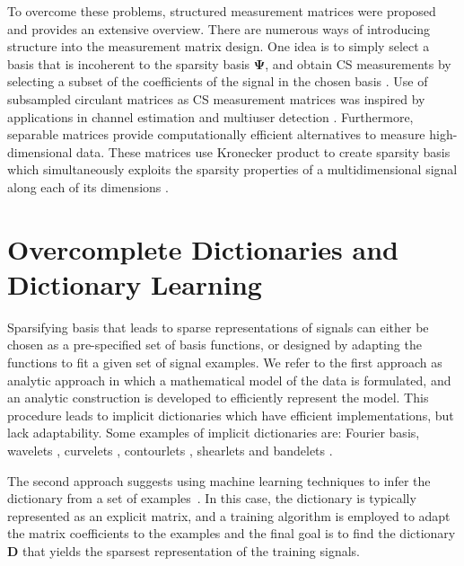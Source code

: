 \documentclass[journal]{IEEEtran}
\begin{document}
To overcome these problems, structured measurement matrices were proposed and \cite{Li2015} provides an extensive overview. There are numerous ways of introducing structure into the measurement matrix design. One idea is to simply select a basis that is incoherent to the sparsity basis $\boldsymbol{\Psi}$, and obtain CS measurements by selecting a subset of the coefficients of the signal in the chosen basis \cite{Candes2007}. Use of subsampled circulant matrices as CS measurement matrices was inspired by applications in channel estimation and multiuser detection \cite{bajwa2007toeplitz, haupt2010toeplitz, yinpractical}. Furthermore, separable matrices provide computationally efficient alternatives to measure high-dimensional data. These matrices use Kronecker product \cite{schacke2013kronecker} to create sparsity basis which simultaneously exploits the sparsity properties of a multidimensional signal along each of its dimensions \cite{Rivenson2009, Duarte2012}.  

\section{Overcomplete Dictionaries and Dictionary Learning} \label{sec:4}

Sparsifying basis that leads to sparse representations of signals can either be chosen as a pre-specified set of basis functions, or designed by adapting the functions to fit a given set of signal examples. We refer to the first approach as analytic approach in which a mathematical model of the data is formulated, and an analytic construction is developed to efficiently represent the model. This procedure leads to implicit dictionaries which have efficient implementations, but lack adaptability. Some examples of implicit dictionaries are: Fourier basis, wavelets \cite{daubechies1992ten}, curvelets \cite{starck2002curvelet}, contourlets \cite{do2002contourlets}, shearlets \cite{guo2007optimally} and bandelets \cite{le2005sparse}. 

The second approach suggests using machine learning techniques to infer the dictionary from a set of examples~\cite{olshausen1996emergence, Petrov2012, Rubinstein, Christen2010}. In this case, the dictionary is typically represented as an explicit matrix, and a training algorithm is employed to adapt the matrix coefficients to the examples and the final goal is to find the dictionary $\boldsymbol{D}$ that yields the sparsest representation of the training signals. 
\end{document}
